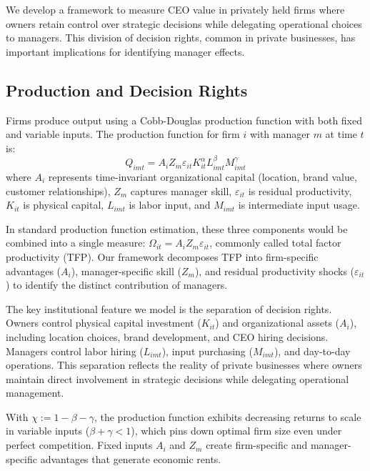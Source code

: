 \documentclass[11pt,a4paper]{article}
\begin{document}
We develop a framework to measure CEO value in privately held firms where owners retain control over strategic decisions while delegating operational choices to managers. This division of decision rights, common in private businesses, has important implications for identifying manager effects.

\subsection{Production and Decision Rights}

Firms produce output using a Cobb-Douglas production function with both fixed and variable inputs. The production function for firm $i$ with manager $m$ at time $t$ is:
\begin{equation}\label{eq:production}
Q_{imt} = A_i Z_{m} \varepsilon_{it} K_{it}^\alpha L_{imt}^{\beta} M_{imt}^{\gamma}
\end{equation}
where $A_i$ represents time-invariant organizational capital (location, brand value, customer relationships), $Z_m$ captures manager skill, $\varepsilon_{it}$ is residual productivity, $K_{it}$ is physical capital, $L_{imt}$ is labor input, and $M_{imt}$ is intermediate input usage. 

In standard production function estimation, these three components would be combined into a single measure: $\Omega_{it} = A_i Z_m \varepsilon_{it}$, commonly called total factor productivity (TFP). Our framework decomposes TFP into firm-specific advantages ($A_i$), manager-specific skill ($Z_m$), and residual productivity shocks ($\varepsilon_{it}$) to identify the distinct contribution of managers. 

The key institutional feature we model is the separation of decision rights. Owners control physical capital investment ($K_{it}$) and organizational assets ($A_i$), including location choices, brand development, and CEO hiring decisions. Managers control labor hiring ($L_{imt}$), input purchasing ($M_{imt}$), and day-to-day operations. This separation reflects the reality of private businesses where owners maintain direct involvement in strategic decisions while delegating operational management.

With $\chi := 1 - \beta - \gamma$, the production function exhibits decreasing returns to scale in variable inputs ($\beta + \gamma < 1$), which pins down optimal firm size even under perfect competition. Fixed inputs $A_i$ and $Z_m$ create firm-specific and manager-specific advantages that generate economic rents.
\end{document}
